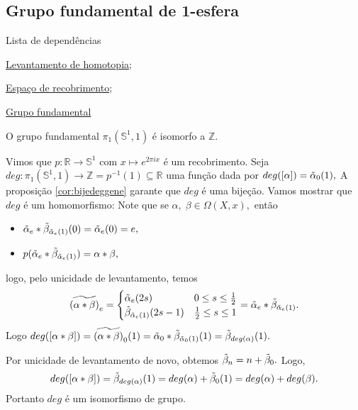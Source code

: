 \subsection{Grupo fundamental de 1-esfera}
\label{grupo-fundamental-de-S1-prop}
\begin{titlemize}{Lista de dependências}
	\item \hyperref[levantamento-de-homotopia-prop]{Levantamento de homotopia};\\ %
	\item \hyperref[espaco-de-recobrimento-def]{Espaço de recobrimento};\\
    \item \hyperref[grupo-fundamental]{Grupo fundamental}
\end{titlemize}

\begin{thm}
    O grupo fundamental $\pi_1(\mathbb{S}^1,1)$ é isomorfo a $\mathbb{Z}.$ 
\end{thm}

\begin{dem}
Vimos que $p:\mathbb{R}\rightarrow \mathbb{S}^1$ com $x\mapsto e^{2\pi i x}$ é um recobrimento. Seja $deg:\pi_1(\mathbb{S}^1,1)\rightarrow \mathbb{Z}=p^{-1}(1)\subseteq \mathbb{R}$ uma função dada por $deg([\alpha])=\Tilde{\alpha}_0(1),$ A proposição \ref{cor:bijedeggene} garante que $deg$ é uma bijeção. Vamos mostrar que $deg$ é um homomorfismo: Note que se $\alpha,\;\beta\in \Omega(X,x),$ então
\begin{itemize}
    \item $\Tilde{\alpha}_e*\Tilde{\beta}_{\Tilde{\alpha}_e (1)}(0)=\Tilde{\alpha}_e(0)=e,$
    \item $p(\Tilde{\alpha}_e*\Tilde{\beta}_{\Tilde{\alpha}_e (1)})=\alpha *\beta,$
\end{itemize}
logo, pelo unicidade de levantamento, temos 
\begin{align*}
\widetilde{(\alpha*\beta)}_e=\begin{cases}
    \Tilde{\alpha}_e (2s)\qquad& 0\le s\le \frac{1}{2}\\
    \Tilde{\beta}_{\Tilde{\alpha}_e (1)}(2s-1)&\frac{1}{2}\le s\le 1
    \end{cases}=\Tilde{\alpha}_e*\Tilde{\beta}_{\Tilde{\alpha}_e (1)}.
\end{align*}
Logo $deg([\alpha*\beta])=\widetilde{(\alpha*\beta)}_0 (1)=\Tilde{\alpha}_0*\Tilde{\beta}_{\Tilde{\alpha}_0 (1)}(1)=\Tilde{\beta}_{deg(\alpha)}(1).$

Por unicidade de levantamento de novo, obtemos $\Tilde{\beta}_n=n+\Tilde{\beta}_0.$ Logo,
\[deg([\alpha*\beta])=\Tilde{\beta}_{deg(\alpha)}(1)=deg(\alpha)+\Tilde{\beta}_0 (1)=deg(\alpha)+deg(\beta).\]
Portanto $deg$ é um isomorfismo de grupo.
\end{dem}

